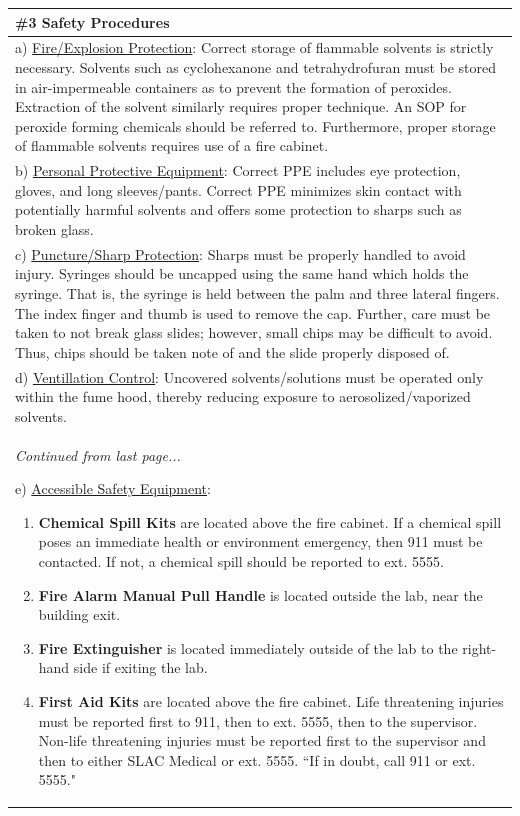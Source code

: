 \documentclass{article}
\begin{document}
\begin{center}
\begin{longtable}{ |p{\textwidth}| }
\hline
\cellcolor{gray!25} \#3 \textbf{Safety Procedures} \\
\hline
a) \underline{Fire/Explosion Protection}: Correct storage of flammable solvents is strictly necessary. Solvents such as cyclohexanone and tetrahydrofuran must be stored in air-impermeable containers as to prevent the formation of peroxides. Extraction of the solvent similarly requires proper technique. An SOP for peroxide forming chemicals should be referred to. Furthermore, proper storage of flammable solvents requires use of a fire cabinet. \\
b) \underline{Personal Protective Equipment}: Correct PPE includes eye protection, gloves, and long sleeves/pants. Correct PPE minimizes skin contact with potentially harmful solvents and offers some protection to sharps such as broken glass. \\
c) \underline{Puncture/Sharp Protection}: Sharps must be properly handled to avoid injury. Syringes should be uncapped using the same hand which holds the syringe. That is, the syringe is held between the palm and three lateral fingers. The index finger and thumb is used to remove the cap. Further, care must be taken to not break glass slides; however, small chips may be difficult to avoid. Thus, chips should be taken note of and the slide properly disposed of. \\
d) \underline{Ventillation Control}: Uncovered solvents/solutions must be operated only within the fume hood, thereby reducing exposure to aerosolized/vaporized solvents. \\
\begin{center}
	\textit{Continued from last page...}
\end{center}
e) \underline{Accessible Safety Equipment}:
\begin{enumerate}
	\item \textbf{Chemical Spill Kits} are located above the fire cabinet. If a chemical spill poses an immediate health or environment emergency, then 911 must be contacted. If not, a chemical spill should be reported to ext. 5555. 
	\item \textbf{Fire Alarm Manual Pull Handle} is located outside the lab, near the building exit.
	\item \textbf{Fire Extinguisher} is located immediately outside of the lab to the right-hand side if exiting the lab.
	\item \textbf{First Aid Kits} are located above the fire cabinet. Life threatening injuries must be reported first to 911, then to ext. 5555, then to the supervisor. Non-life threatening injuries must be reported first to the supervisor and then to either SLAC Medical or ext. 5555. ``If in doubt, call 911 or ext. 5555."

\end{enumerate}
\end{longtable}
\end{center}
\end{document}
